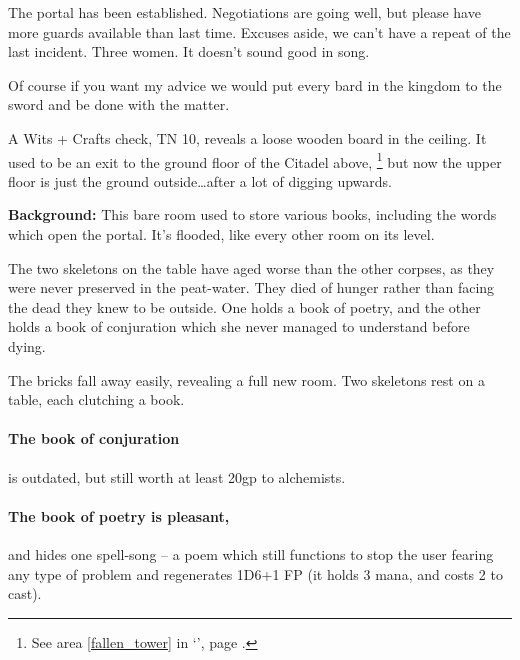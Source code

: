\begin{multicols}{2}
\begin{exampletext}
\end{exampletext}

\begin{exampletext}

  The portal has been established.  Negotiations are going well, but please have more guards available than last time.  Excuses aside, we can't have a repeat of the last incident.  Three women.  It doesn't sound good in song.

  Of course if you want my advice we would put every bard in the kingdom to the sword and be done with the matter.

\end{exampletext}

A Wits + Crafts check, TN 10, reveals a loose wooden board in the ceiling.
It used to be an exit to the ground floor of the Citadel above,%
\footnote{See area \ref{fallen_tower} in `', page \pageref{fallen_tower}.}
but now the upper floor is just the ground outside\ldots after a lot of digging upwards.


\textbf{Background:}
This bare room used to store various books, including the words which open the portal.
It's flooded, like every other room on its level.

The two skeletons on the table have aged worse than the other corpses, as they were never preserved in the peat-water.
They died of hunger rather than facing the dead they knew to be outside.
One holds a book of poetry, and the other holds a book of conjuration which she never managed to understand before dying.

\begin{boxtext}

  The bricks fall away easily, revealing a full new room.  Two skeletons rest on a table, each clutching a book.

\end{boxtext}

\paragraph{The book of conjuration}
is outdated, but still worth at least 20gp to \gls{alchemists}.

\paragraph{The book of poetry is pleasant,}
and hides one spell-song -- a poem which still functions to stop the user fearing any type of problem and regenerates 1D6+1 FP (it holds 3 mana, and costs 2 to cast).


\end{multicols}

